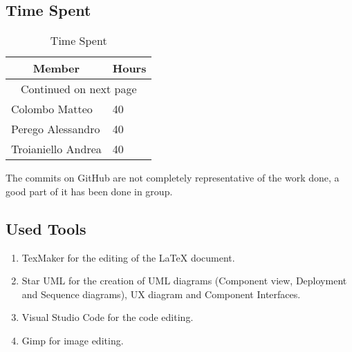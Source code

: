 \subsection{Time Spent}

\begin{center}
\begin{longtable}{|p{8cm} | p{5cm}|}
\hline \multicolumn{1}{|c|}{\textbf{Member}} & \multicolumn{1}{c|}{\textbf{Hours}} \\ \hline 
\endfirsthead
\hline
\endhead
\hline \multicolumn{2}{c}{{Continued on next page}} \\
\endfoot
\hline
\caption{Time Spent}
\label{ref:timespent}
\endlastfoot
Colombo Matteo & 40 \\
\hline 
Perego Alessandro & 40 \\ 
\hline
Troianiello Andrea & 40 \\
\end{longtable}
\end{center}
The commits on GitHub are not completely representative of the work done, a good part of it has been done in group.

\subsection{Used Tools}

\begin{enumerate}
\item
TexMaker for the editing of the LaTeX document.
\item
Star UML for the creation of UML diagrams (Component view, Deployment and Sequence diagrams), UX diagram and Component Interfaces.
\item
Visual Studio Code for the code editing.
\item
Gimp for image editing.
\end{enumerate}
